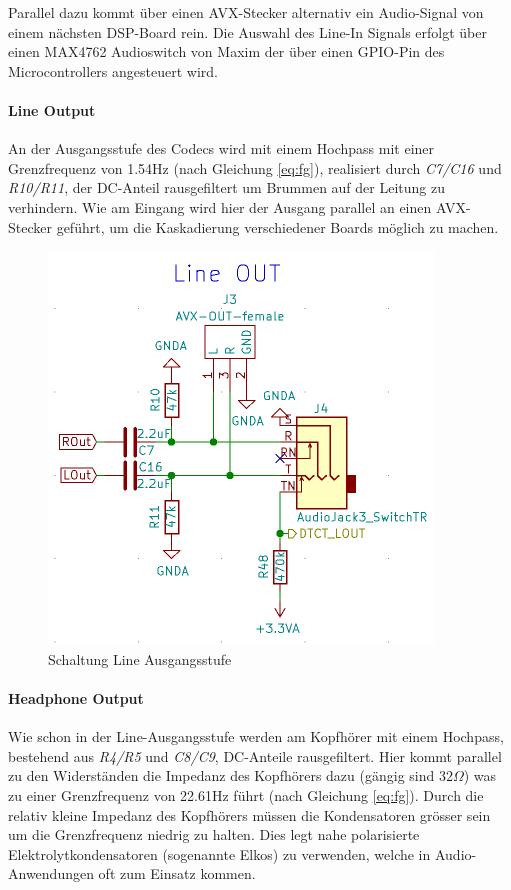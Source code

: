 Parallel dazu kommt über einen AVX-Stecker alternativ ein Audio-Signal von einem nächsten DSP-Board rein. Die Auswahl des Line-In Signals erfolgt über einen MAX4762 \cite{max4762} Audioswitch von Maxim der über einen GPIO-Pin des Microcontrollers angesteuert wird. 

\paragraph{Line Output}
\label{par:LineOUT}
An der Ausgangsstufe des Codecs wird mit einem Hochpass mit einer Grenzfrequenz von 1.54Hz (nach Gleichung \ref{eq:fg}), realisiert durch \textit{C7/C16} und \textit{R10/R11}, der DC-Anteil rausgefiltert um Brummen auf der Leitung zu verhindern.
Wie am Eingang wird hier der Ausgang parallel an einen AVX-Stecker geführt, um die Kaskadierung verschiedener Boards möglich zu machen.


\begin{figure} [H]
\begin{center}
 \includegraphics[scale=0.5]{../graphics/Schema_LineOUT.png}
\caption{Schaltung Line Ausgangsstufe}
\label{fig:Schema_LineOUT}
\end{center}
\end{figure}


\paragraph{Headphone Output}
\label{par:HPOUT}
Wie schon in der Line-Ausgangsstufe werden am Kopfhörer mit einem Hochpass, bestehend aus \textit{R4/R5} und \textit{C8/C9}, DC-Anteile rausgefiltert. Hier kommt parallel zu den Widerständen die Impedanz des Kopfhörers dazu (gängig sind $32\Omega$) was zu einer Grenzfrequenz von 22.61Hz führt (nach Gleichung \ref{eq:fg}). Durch die relativ kleine Impedanz des Kopfhörers müssen die Kondensatoren grösser sein um die Grenzfrequenz niedrig zu halten. Dies legt nahe polarisierte Elektrolytkondensatoren (sogenannte Elkos) zu verwenden, welche in Audio-Anwendungen oft zum Einsatz kommen.

